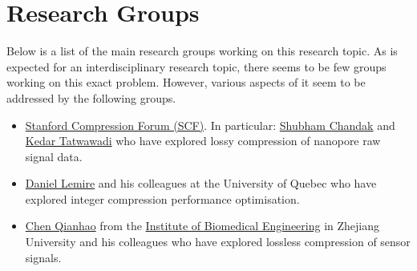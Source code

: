 \documentclass[a4paper, 12pt]{article}
\begin{document}
\section{Research Groups}
Below is a list of the main research groups working on this research topic. As is expected for an interdisciplinary research topic, there seems to be few groups working on this exact problem. However, various aspects of it seem to be addressed by the following groups.
\begin{itemize}
	\item \href{https://compression.stanford.edu/about-scf}{Stanford Compression Forum (SCF)}. In particular: \href{https://scholar.google.com/citations?hl=en&user=t1u0f5QAAAAJ}{Shubham Chandak} and \href{https://scholar.google.com/citations?hl=en&user=RU0ZAp4AAAAJ}{Kedar Tatwawadi} who have explored lossy compression of nanopore raw signal data.
	\item \href{https://www.teluq.ca/siteweb/univ/en/dlemire.html#onglet1369}{Daniel Lemire} and his colleagues at the University of Quebec who have explored integer compression performance optimisation.
	\item \href{https://sciprofiles.com/profile/1532550}{Chen Qianhao} from the \href{http://www.cbeis.zju.edu.cn/cbeisen/2018/0702/c23757a902246/page.htm}{Institute of Biomedical Engineering} in Zhejiang University and his colleagues who have explored lossless compression of sensor signals.
\end{itemize}
\end{document}

